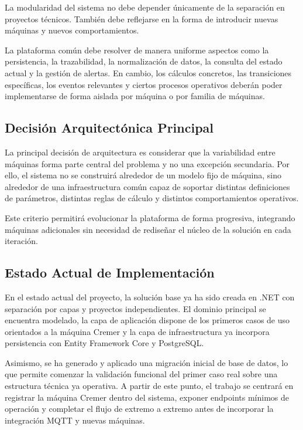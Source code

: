 La modularidad del sistema no debe depender únicamente de la separación en proyectos técnicos. También debe reflejarse en la forma de introducir nuevas máquinas y nuevos comportamientos.

La plataforma común debe resolver de manera uniforme aspectos como la persistencia, la trazabilidad, la normalización de datos, la consulta del estado actual y la gestión de alertas. En cambio, los cálculos concretos, las transiciones específicas, los eventos relevantes y ciertos procesos operativos deberán poder implementarse de forma aislada por máquina o por familia de máquinas.

\subsection{Decisión Arquitectónica Principal}

La principal decisión de arquitectura es considerar que la variabilidad entre máquinas forma parte central del problema y no una excepción secundaria. Por ello, el sistema no se construirá alrededor de un modelo fijo de máquina, sino alrededor de una infraestructura común capaz de soportar distintas definiciones de parámetros, distintas reglas de cálculo y distintos comportamientos operativos.

Este criterio permitirá evolucionar la plataforma de forma progresiva, integrando máquinas adicionales sin necesidad de rediseñar el núcleo de la solución en cada iteración.

\subsection{Estado Actual de Implementación}

En el estado actual del proyecto, la solución base ya ha sido creada en .NET con separación por capas y proyectos independientes. El dominio principal se encuentra modelado, la capa de aplicación dispone de los primeros casos de uso orientados a la máquina Cremer y la capa de infraestructura ya incorpora persistencia con Entity Framework Core y PostgreSQL.

Asimismo, se ha generado y aplicado una migración inicial de base de datos, lo que permite comenzar la validación funcional del primer caso real sobre una estructura técnica ya operativa. A partir de este punto, el trabajo se centrará en registrar la máquina Cremer dentro del sistema, exponer endpoints mínimos de operación y completar el flujo de extremo a extremo antes de incorporar la integración MQTT y nuevas máquinas.